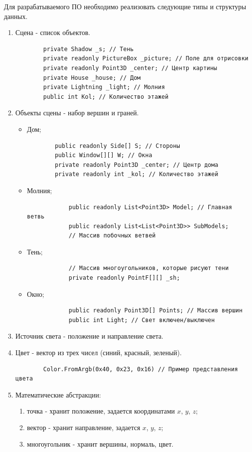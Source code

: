 Для разрабатываемого ПО необходимо реализовать следующие типы и структуры данных.
\begin{enumerate}
	\item Сцена - список объектов.
	
	\begin{verbatim}
		private Shadow _s; // Тень
		private readonly PictureBox _picture; // Поле для отрисовки
		private readonly Point3D _center; // Центр картины
		private House _house; // Дом
		private Lightning _light; // Молния
		public int Kol; // Количество этажей
	\end{verbatim}

	\item Объекты сцены - набор вершин и граней.
	
	\begin{itemize}
		\item Дом;
		\begin{verbatim}
		public readonly Side[] S; // Стороны
		public Window[][] W; // Окна
		private readonly Point3D _center; // Центр дома
		private readonly int _kol; // Количество этажей
		\end{verbatim}
		
		\item Молния;
		
		\begin{verbatim}
			public readonly List<Point3D> Model; // Главная ветвь
			public readonly List<List<Point3D>> SubModels; 
			// Массив побочных ветвей
		\end{verbatim}
	
		\item Тень;
		\begin{verbatim}
			// Массив многоугольников, которые рисуют тени
			private readonly PointF[][] _sh; 
		\end{verbatim}
	
		\item Окно;
		\begin{verbatim}
			public readonly Point3D[] Points; // Массив вершин
			public int Light; // Свет включен/выключен
		\end{verbatim}
	\end{itemize}
	\item Источник света - положение и направление света.
	\item Цвет - вектор из трех чисел (синий, красный, зеленый).
	\begin{verbatim}
		Color.FromArgb(0x40, 0x23, 0x16) // Пример представления цвета
	\end{verbatim}
	\item Математические абстракции:
	\begin{enumerate}
		\item точка - хранит положение, задается координатами $x$, $y$, $z$;
		\item вектор - хранит направление, задается  $x$, $y$, $z$;

		\item многоугольник - хранит вершины, нормаль, цвет.
	\end{enumerate}
\end{enumerate}


